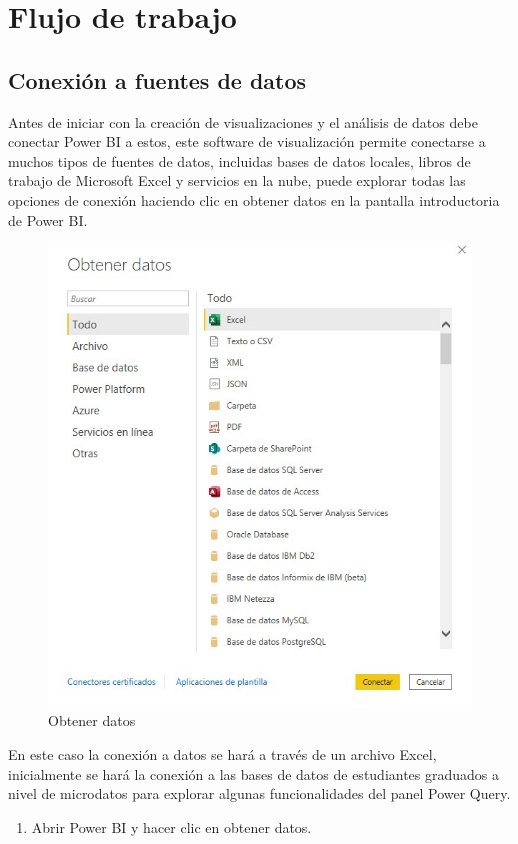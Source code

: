 \documentclass[
]{book}
\providecommand{\tightlist}{%
  \setlength{\itemsep}{0pt}\setlength{\parskip}{0pt}}
\begin{document}
\hypertarget{flujotrabajopowerbi}{%
\section{Flujo de trabajo}\label{flujotrabajopowerbi}}

\hypertarget{conexionfuentesdatospowerbi}{%
\subsection{Conexión a fuentes de datos}\label{conexionfuentesdatospowerbi}}

Antes de iniciar con la creación de visualizaciones y el análisis de datos debe conectar Power BI a estos, este software de visualización permite conectarse a muchos tipos de fuentes de datos, incluidas bases de datos locales, libros de trabajo de Microsoft Excel y servicios en la nube, puede explorar todas las opciones de conexión haciendo clic en obtener datos en la pantalla introductoria de Power BI.

\begin{figure}

{\centering \includegraphics[width=0.6\linewidth]{Imágenes/powerbi8} 

}

\caption{Obtener datos}\label{fig:obtenerdatospbi-fig}
\end{figure}

En este caso la conexión a datos se hará a través de un archivo Excel, inicialmente se hará la conexión a las bases de datos de estudiantes graduados a nivel de microdatos para explorar algunas funcionalidades del panel Power Query.

\begin{enumerate}
\def\labelenumi{\arabic{enumi}.}
\tightlist
\item
  Abrir Power BI y hacer clic en obtener datos.
\end{enumerate}
\end{document}
